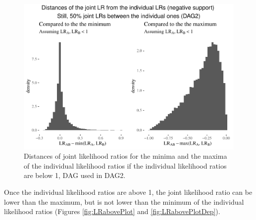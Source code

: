 \documentclass[
  10pt,
  dvipsnames,enabledeprecatedfontcommands]{scrartcl}
\begin{document}
\vspace{1mm}
\footnotesize

\normalsize

\begin{figure}


\begin{center}\includegraphics[width=1\linewidth]{conjunction-appendix9_files/figure-latex/unnamed-chunk-14-1} \end{center}

\caption{Distances of joint likelihood ratios for the minima and the maxima of the individual likelihood ratios if the individual likelihood ratios are below 1, DAG used in \textsf{DAG2}.} 
\label{fig:LRlowerPlot2}
\end{figure}

Once the individual likelihood ratios are above 1, the joint likelihood
ratio can be lower than the maximum, but is not lower than the minimum
of the individual likelihood ratios (Figures \ref{fig:LRabovePlot} and
\ref{fig:LRabovePlotDep}).
\end{document}
